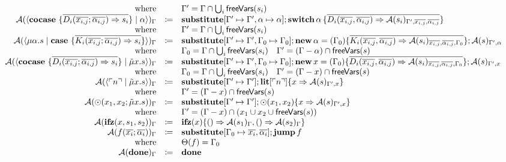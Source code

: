 \[\begin{array}{rcll}
    \text{where} &  & \Gamma' = \Gamma \cap \bigcup_i \mathsf{freeVars}(s_i) & \\
    \mathcal{A}(\langle \mathbf{cocase}\ \{ \overline{D_i(\overline{x_{i,j}}; \overline{\alpha_{i,j}}) \Rightarrow s_i} \} \mid \alpha \rangle)_{\Gamma} & \coloneq & \mathbf{substitute}[\Gamma' \mapsto \Gamma', \alpha \mapsto \alpha]; \mathbf{switch}\, \alpha\, \{ \overline{D_i(\overline{x_{i,j}}, \overline{\alpha_{i,j}}) \Rightarrow \mathcal{A}(s_i)_{\Gamma', \overline{x_{i,j}}, \overline{\alpha_{i,j}}}} \} & \\
    \text{where} &  & \Gamma' = \Gamma \cap \bigcup_i \mathsf{freeVars}(s_i) & \\
    \mathcal{A}(\langle \mu\alpha.s \mid \mathbf{case}\ \{ \overline{K_i(\overline{x_{i,j}}; \overline{\alpha_{i,j}}) \Rightarrow s_i} \} \rangle)_{\Gamma} & \coloneq & \mathbf{substitute}[\Gamma' \mapsto \Gamma', \Gamma_0 \mapsto \Gamma_0]; \mathbf{new}\, \alpha = (\Gamma_0)\{ \overline{K_i(\overline{x_{i,j}}, \overline{\alpha_{i,j}}) \Rightarrow \mathcal{A}(s_i)_{\overline{x_{i,j}}, \overline{\alpha_{i,j}}, \Gamma_0}} \}; \mathcal{A}(s)_{\Gamma', \alpha} & \\
    \text{where} &  & \Gamma_0 = \Gamma \cap \bigcup_i \mathsf{freeVars}(s_i)  \quad  \Gamma' = (\Gamma - \alpha) \cap \mathsf{freeVars}(s) & \\
    \mathcal{A}(\langle \mathbf{cocase}\ \{ \overline{D_i(\overline{x_{i,j}}; \overline{\alpha_{i,j}}) \Rightarrow s_i} \} \mid \tilde{\mu}x.s \rangle)_{\Gamma} & \coloneq & \mathbf{substitute}[\Gamma' \mapsto \Gamma', \Gamma_0 \mapsto \Gamma_0]; \mathbf{new}\, x = (\Gamma_0)\{ \overline{D_i(\overline{x_{i,j}}, \overline{\alpha_{i,j}}) \Rightarrow \mathcal{A}(s_i)_{\overline{x_{i,j}}, \overline{\alpha_{i,j}}, \Gamma_0}} \}; \mathcal{A}(s)_{\Gamma', x} & \\
    \text{where} &  & \Gamma_0 = \Gamma \cap \bigcup_i \mathsf{freeVars}(s_i)  \quad  \Gamma' = (\Gamma - x) \cap \mathsf{freeVars}(s) & \\
    \mathcal{A}(\langle \ulcorner n \urcorner \mid \tilde{\mu}x.s \rangle)_{\Gamma} & \coloneq & \mathbf{substitute}[\Gamma' \mapsto \Gamma']; \mathbf{lit}[\ulcorner n \urcorner]\{ x \Rightarrow \mathcal{A}(s)_{\Gamma', x} \} & \\
    \text{where} &  & \Gamma' = (\Gamma - x)\cap \mathsf{freeVars}(s) & \\
    \mathcal{A}(\odot(x_1, x_2; \tilde{\mu}x.s))_{\Gamma} & \coloneq & \mathbf{substitute}[\Gamma' \mapsto \Gamma']; \odot(x_1, x_2)\{ x \Rightarrow \mathcal{A}(s)_{\Gamma', x} \} & \\
    \text{where} &  & \Gamma' = (\Gamma - x) \cap (x_1 \cup x_2 \cup \mathsf{freeVars}(s)) & \\
    \mathcal{A}(\mathbf{ifz}(x, s_1, s_2))_{\Gamma}{} & \coloneq & \mathbf{ifz}(x)\{ () \Rightarrow \mathcal{A}(s_1)_{\Gamma}, () \Rightarrow \mathcal{A}(s_2)_{\Gamma} \} & \\
    \mathcal{A}(f(\overline{x_i}; \overline{\alpha_i}))_{\Gamma} & \coloneq & \mathbf{substitute}[\Gamma_0 \mapsto \overline{x_i}, \overline{\alpha_i}]; \mathbf{jump}\, f & \\
    \text{where} &  & \Theta(f) = \Gamma_0 & \\
    \mathcal{A}(\mathbf{done})_{\Gamma} & \coloneq & \mathbf{done} & \\
  \end{array}
\]
